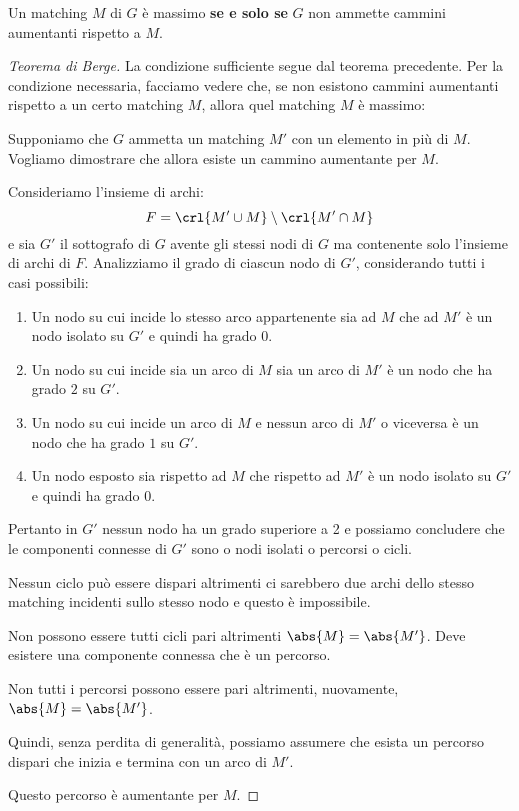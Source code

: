 \documentclass[\main/main.tex]{subfiles}
\begin{document}
\begin{theorem}
  Un matching \(M\) di \(G\) è massimo \textbf{se e solo se} \(G\) non ammette cammini aumentanti rispetto a \(M\).
\end{theorem}
\begin{proof}[Teorema di Berge]
  La condizione sufficiente segue dal teorema precedente. Per la condizione necessaria, facciamo vedere che, se non esistono cammini aumentanti rispetto a un certo matching \(M\), allora quel matching \(M\) è massimo:

  Supponiamo che \(G\) ammetta un matching \(M'\) con un elemento in più di \(M\). Vogliamo dimostrare che allora esiste un cammino aumentante per \(M\).

  Consideriamo l'insieme di archi:
  \[
    F = \crl{M'\cup M}\setminus\crl{M' \cap M}
  \]
  e sia \(G'\) il sottografo di \(G\) avente gli stessi nodi di \(G\) ma contenente solo l'insieme di archi di \(F\). Analizziamo il grado di ciascun nodo di \(G'\), considerando tutti i casi possibili:
  \begin{enumerate}
    \item Un nodo su cui incide lo stesso arco appartenente sia ad \(M\) che ad \(M'\) è un nodo isolato su \(G'\) e quindi ha grado 0.
    \item Un nodo su cui incide sia un arco di \(M\) sia un arco di \(M'\) è un nodo che ha grado \(2\) su \(G'\).
    \item Un nodo su cui incide un arco di \(M\) e nessun arco di \(M'\) o viceversa è un nodo che ha grado \(1\) su \(G'\).
    \item Un nodo esposto sia rispetto ad \(M\) che rispetto ad \(M'\) è un nodo isolato su \(G'\) e quindi ha grado 0.
  \end{enumerate}
  Pertanto in \(G'\) nessun nodo ha un grado superiore a 2 e possiamo concludere che le componenti connesse di \(G'\) sono o nodi isolati o percorsi o cicli.

  Nessun ciclo può essere dispari altrimenti ci sarebbero due archi dello stesso matching incidenti sullo stesso nodo e questo è impossibile.

  Non possono essere tutti cicli pari altrimenti \(\abs{M} = \abs{M'}\). Deve esistere una componente connessa che è un percorso.

  Non tutti i percorsi possono essere pari altrimenti, nuovamente, \(\abs{M} = \abs{M'}\).

  Quindi, senza perdita di generalità, possiamo assumere che esista un percorso dispari che inizia e termina con un arco di \(M'\).

  Questo percorso è aumentante per \(M\).
\end{proof}
\end{document}
